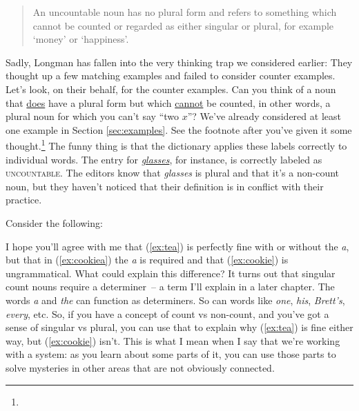 \begin{quote}
    An uncountable noun has no plural form and refers to something which cannot be counted or regarded as either singular or plural, for example `money' or `happiness'.
\end{quote}
Sadly, Longman has fallen into the very thinking trap we considered earlier: They thought up a few matching examples and failed to consider counter examples. Let's look, on their behalf, for the counter examples. Can you think of a noun that \uline{does} have a plural form but which \uline{cannot} be counted, in other words, a plural noun for which you can't say ``two $x$''? We've already considered at least one example in Section \ref{sec:examples}. See the footnote after you've given it some thought.\footnote{
} The funny thing is that the dictionary applies these labels correctly to individual words. The entry for \href{https://www.ldoceonline.com/dictionary/glasses/}{\textit{glasses}}, for instance, is correctly labeled as \textsc{uncountable}. The editors know that \textit{glasses} is plural and that it's a non-count noun, but they haven't noticed that their definition is in conflict with their practice.



\begin{tcolorbox}[title=Why does this matter?, colback=white]
    Consider the following: 
    
    \ea
        \label{ex:tea}
        \label{ex:cookiea}
        \label{ex:cookie}
        \z\label{ex:blank}
    \z
    
    I hope you'll agree with me that (\ref{ex:tea}) is perfectly fine with or without the \textit{a}, but that in (\ref{ex:cookiea}) the \textit{a} is required and that (\ref{ex:cookie}) is ungrammatical. What could explain this difference? It turns out that singular count nouns require a determiner~-- a term I'll explain in a later chapter. The words \textit{a} and \textit{the} can function as determiners. So can words like \textit{one}, \textit{his}, \textit{Brett's}, \textit{every}, etc. So, if you have a concept of count vs non-count, and you've got a sense of singular vs plural, you can use that to explain why (\ref{ex:tea}) is fine either way, but (\ref{ex:cookie}) isn't. This is what I mean when I say that we're working with a system: as you learn about some parts of it, you can use those parts to solve mysteries in other areas that are not obviously connected.
\end{tcolorbox}

